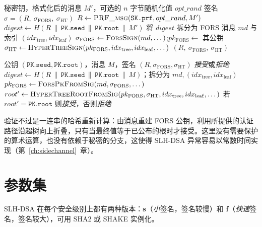 \begin{algorithm}[H]
\caption{SLH-DSA.Sign（教学形式）}
\label{alg:slhdsa-sign}
\begin{algorithmic}[1]
\Require 秘密钥，格式化后的消息 $M'$，可选的 $n$ 字节随机化值 $opt\_rand$
\Ensure 签名 $\sigma = (R,\ \sigma_{\mathrm{FORS}},\ \sigma_{\mathrm{HT}})$
\State $R \gets \textsc{PRF\_msg}(\texttt{SK.prf}, opt\_rand, M')$ 
\State $digest \gets H(R \,\|\, \texttt{PK.seed} \,\|\, \texttt{PK.root} \,\|\, M')$
\State 将 $digest$ 拆分为 FORS 消息 $md$ 与索引 $(idx_{\mathrm{tree}}, idx_{\mathrm{leaf}})$
\State $\sigma_{\mathrm{FORS}} \gets \textsc{ForsSign}(md, \dots)$;\quad $pk_{\mathrm{FORS}} \gets$ 其公钥
\State $\sigma_{\mathrm{HT}} \gets \textsc{HyperTreeSign}(pk_{\mathrm{FORS}}, idx_{\mathrm{tree}}, idx_{\mathrm{leaf}}, \dots)$
\State \Return $(R,\ \sigma_{\mathrm{FORS}},\ \sigma_{\mathrm{HT}})$
\end{algorithmic}
\end{algorithm}

\begin{algorithm}[H]
\caption{SLH-DSA.Verify（教学形式）}
\label{alg:slhdsa-verify}
\begin{algorithmic}[1]
\Require 公钥 $(\texttt{PK.seed},\texttt{PK.root})$，消息 $M$，签名 $(R,\sigma_{\mathrm{FORS}},\sigma_{\mathrm{HT}})$
\Ensure \emph{接受}或\emph{拒绝}
\State $digest \gets H(R \,\|\, \texttt{PK.seed} \,\|\, \texttt{PK.root} \,\|\, M)$；拆分为 $md,(idx_{\mathrm{tree}},idx_{\mathrm{leaf}})$
\State $pk_{\mathrm{FORS}} \gets \textsc{ForsPkFromSig}(md, \sigma_{\mathrm{FORS}}, \dots)$
\State $root' \gets \textsc{HyperTreeRootFromSig}(pk_{\mathrm{FORS}}, \sigma_{\mathrm{HT}}, idx_{\mathrm{tree}}, idx_{\mathrm{leaf}}, \dots)$
\State \Return 若 $root' = \texttt{PK.root}$ 则\emph{接受}，否则\emph{拒绝}
\end{algorithmic}
\end{algorithm}

验证不过是一连串的哈希重新计算：由消息重建 FORS 公钥，利用所提供的认证路径沿超树向上折叠，只有当最终值等于已公布的根时才接受。这里没有需要保护的算术运算，也没有依赖于秘密的分支，这使得 SLH-DSA 异常容易以常数时间实现（第~\ref{ch:sidechannel}~章）。

\section{参数集}
SLH-DSA 在每个安全级别上都有两种版本：\textbf{s}（\emph{小}签名，签名较慢）和 \textbf{f}（\emph{快速}签名，签名较大），可用 SHA2 或 SHAKE 实例化。

